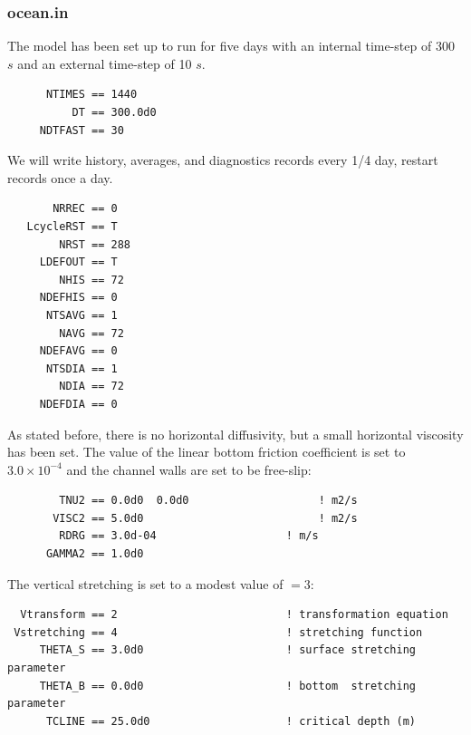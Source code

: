 \subsubsection{ocean.in}
The model has been set up to run for five days with an internal time-step
of 300 $s$ and an external time-step of 10 $s$.
\begin{verbatim}
      NTIMES == 1440
          DT == 300.0d0
     NDTFAST == 30
\end{verbatim}
  We will write history, averages, and diagnostics
records every 1/4 day, restart records once a day.
\begin{verbatim}
       NRREC == 0
   LcycleRST == T
        NRST == 288
     LDEFOUT == T
        NHIS == 72
     NDEFHIS == 0
      NTSAVG == 1
        NAVG == 72
     NDEFAVG == 0
      NTSDIA == 1
        NDIA == 72
     NDEFDIA == 0
\end{verbatim}
As stated before, there is no horizontal diffusivity, but a small
horizontal viscosity has been set. The value of the linear bottom
friction coefficient  is set to $3.0 \times 10^{-4}$ and the
channel walls are set to be free-slip:
\begin{verbatim}
        TNU2 == 0.0d0  0.0d0                    ! m2/s
       VISC2 == 5.0d0                           ! m2/s
        RDRG == 3.0d-04                    ! m/s
      GAMMA2 == 1.0d0
\end{verbatim}
The vertical stretching is set to a modest value of
$=3$:
\begin{verbatim}
  Vtransform == 2                          ! transformation equation
 Vstretching == 4                          ! stretching function
     THETA_S == 3.0d0                      ! surface stretching parameter
     THETA_B == 0.0d0                      ! bottom  stretching parameter
      TCLINE == 25.0d0                     ! critical depth (m)
\end{verbatim}

